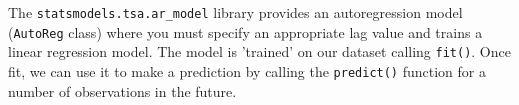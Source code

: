 The \texttt{statsmodels.tsa.ar\_model} library provides an
autoregression model (\texttt{AutoReg}
class) where you must specify an appropriate lag value and
trains a linear regression model. The model is 'trained' on our dataset
calling \texttt{fit()}.
Once fit, we can use it to make a prediction by calling the
\texttt{predict()} function for a number of observations in the future.

%
%
%
%

